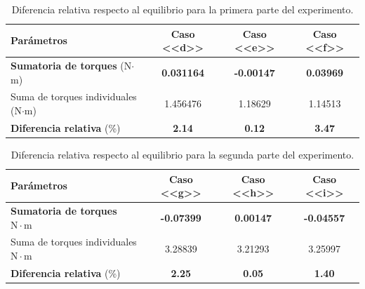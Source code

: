 \begin{table}[H]
\centering
\begin{tabular}{lccc}
\toprule
\textbf{Parámetros} & \textbf{Caso <<d>>} & \textbf{Caso <<e>>} & \textbf{Caso <<f>>} \\
\midrule
\textbf{Sumatoria de torques} (N$\cdot$m)
& \textbf{0.031164}
& \textbf{-0.00147}
& \textbf{0.03969} \\
\midrule
Suma de torques individuales (N$\cdot$m)
& 1.456476
& 1.18629
& 1.14513 \\
\midrule
\textbf{Diferencia relativa} (\%)
& \textbf{2.14}
& \textbf{0.12}
& \textbf{3.47} \\
\bottomrule
\end{tabular}
\caption{Diferencia relativa respecto al equilibrio para la primera parte del experimento.}
\end{table}

\begin{table}[H]
\centering
\begin{tabular}{lccc}
\toprule
\textbf{Parámetros} & \textbf{Caso <<g>>} & \textbf{Caso <<h>>} & \textbf{Caso <<i>>} \\
\midrule
\textbf{Sumatoria de torques} $\mathrm{N\cdot m}$ & \textbf{-0.07399} & \textbf{0.00147} & \textbf{-0.04557} \\
\midrule
Suma de torques individuales $\mathrm{N\cdot m}$ & 3.28839 & 3.21293 & 3.25997 \\
\midrule
\textbf{Diferencia relativa} (\%) & \textbf{2.25} & \textbf{0.05} & \textbf{1.40} \\
\bottomrule
\end{tabular}
\caption{Diferencia relativa respecto al equilibrio para la segunda parte del experimento.}
\end{table}